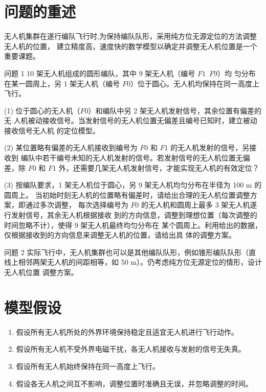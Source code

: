 \documentclass{ctexart}
\begin{document}
	\section{问题的重述}
	无人机集群在遂行编队飞行时,为保持编队队形，采用纯方位无源定位的方法调整无人机的位置，
建立精度高，速度快的数学模型以确定并调整无人机位置是一个重要课题。
\par
问题 1
10 架无人机组成的圆形编队，其中 9 架无人机（编号 $F1$~$F9$）均
匀分布在某一圆周上，另 1 架无人机（编号 $F0$）位于圆心。无人机均保持在同一高度上飞行。
\par
	(1) 位于圆心的无人机（$F0$）和编队中另 2 架无人机发射信号，其余位置有偏差的无
人机被动接收信号。当发射信号的无人机位置无偏差且编号已知时，建立被动接收信号无人机
的定位模型。
\par
	(2) 某位置略有偏差的无人机接收到编号为 $F0$ 和 $F1$ 的无人机发射的信号，另接收到
编队中若干编号未知的无人机发射的信号。若发射信号的无人机位置无偏差，除 $F0$ 和 $F1$
外，还需要几架无人机发射信号，才能实现无人机的有效定位？
\par
	(3) 按编队要求，1 架无人机位于圆心，另 9 架无人机均匀分布在半径为 100 m 的圆周上。
当初始时刻无人机的位置略有偏差时，请给出合理的无人机位置调整方案，即通过多次调整，
每次选择编号为 $F0$ 的无人机和圆周上最多 3 架无人机遂行发射信号，其余无人机根据接收
到的方向信息，调整到理想位置（每次调整的时间忽略不计），使得 9 架无人机最终均匀分布在
某个圆周上。利用给出的数据，仅根据接收到的方向信息来调整无人机的位置，请给出具
体的调整方案。
\par
\vspace{0.5em}
	问题 2 实际飞行中，无人机集群也可以是其他编队队形，例如锥形编队队形（直
线上相邻两架无人机的间距相等，如 50 m）。仍考虑纯方位无源定位的情形，设计无人机位置
调整方案。
	\section{模型假设}
\begin{enumerate}
	\item 假设所有无人机所处的外界环境保持稳定且适宜无人机进行飞行动作。
	\item 假设所有无人机不受外界电磁干扰，各无人机接收与发射的信号无失真。
	\item 假设所有无人机始终保持在同一高度上飞行。
	\item 假设各无人机之间互不影响，调整位置时准确且无误，并忽略调整的时间。
	
	
	\end{enumerate}
\end{document}
